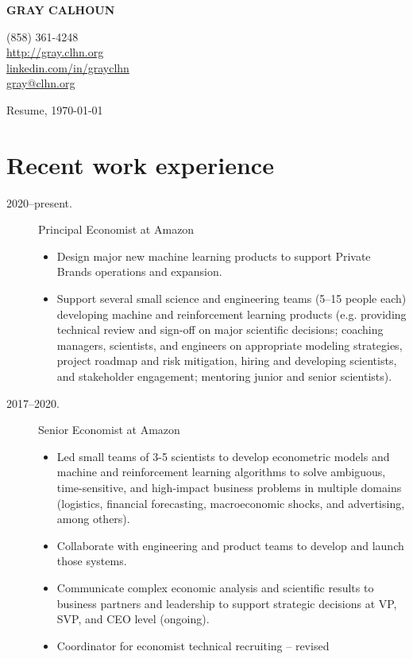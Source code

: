 \documentclass[10pt]{safecv}%
\begin{document}
\MakeUppercase{\textbf{Gray Calhoun}}
\hfill
\parbox[t][0pt]{5cm}{%
\hfill (858) 361-4248 \\
\hfill \url{http://gray.clhn.org}\\
\hfill \href{https://www.linkedin.com/in/grayclhn}{linkedin.com/in/grayclhn} \\
\hfill \url{gray@clhn.org}
}

\vspace{\itemsep}%
Resume, \today

\section*{Recent work experience}

\begin{description}
\item[2020--present.] Principal Economist at Amazon
  \begin{itemize}
  \item Design major new machine learning products to support Private
    Brands operations and expansion.
  \item Support several small science and engineering teams (5--15
    people each) developing machine and reinforcement learning
    products (e.g. providing technical review and sign-off on major
    scientific decisions; coaching managers, scientists, and engineers
    on appropriate modeling strategies, project roadmap and risk
    mitigation, hiring and developing scientists, and stakeholder
    engagement; mentoring junior and senior scientists).
  \end{itemize}
\item[2017--2020.] Senior Economist at Amazon
  \begin{itemize}
  \item Led small teams of 3-5 scientists to develop econometric
    models and machine and reinforcement learning algorithms to solve
    ambiguous, time-sensitive, and high-impact business problems in
    multiple domains (logistics, financial forecasting, macroeconomic
    shocks, and advertising, among others).
  \item Collaborate with engineering and product teams to develop and
    launch those systems.
  \item Communicate complex economic analysis and scientific results
    to business partners and leadership to support strategic decisions
    at VP, SVP, and CEO level (ongoing).
  \item Coordinator for economist technical recruiting -- revised

\end{itemize}
\end{description}
\end{document}
